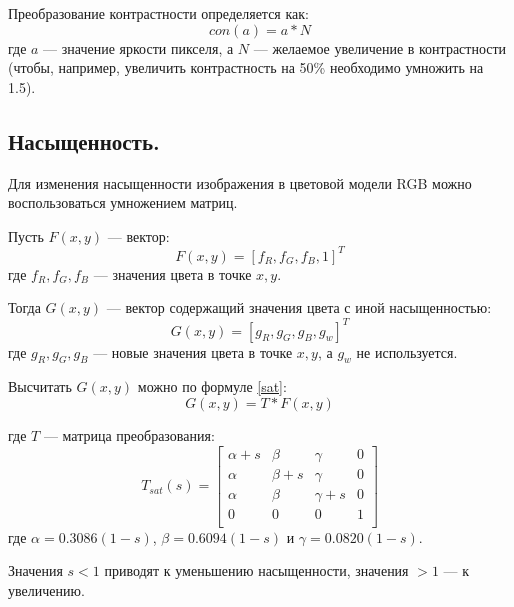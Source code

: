Преобразование контрастности определяется как:
\begin{equation}
	\label{contrast}
	con(a) = a * N
\end{equation}
где $a$ --- значение яркости пикселя, а $N$ --- желаемое увеличение в контрастности (чтобы, например, увеличить контрастность на 50\% необходимо умножить на 1.5). \cite{brk}


\subsection{Насыщенность.}

Для изменения насыщенности изображения в цветовой модели RGB можно воспользоваться умножением матриц.

Пусть $F(x,y)$ --- вектор:
\begin{equation}
	\label{F}
	F(x,y) = [f_R, f_G, f_B, 1]^T
\end{equation}
где $f_R, f_G, f_B$ --- значения цвета в точке $x,y$.

Тогда $G(x,y)$ --- вектор содержащий значения цвета с иной насыщенностью:
\begin{equation}
	\label{G}
	G(x,y) = [g_R, g_G, g_B, g_w]^T
\end{equation}
где $g_R, g_G, g_B$ --- новые значения цвета в точке $x,y$, а $g_w$ не используется.

Высчитать $G(x,y)$ можно по формуле \ref{sat}:
\begin{equation}
	\label{sat}
	G(x,y) = T * F(x,y)
\end{equation}

где $T$ --- матрица преобразования:
\begin{equation}
	\label{tsat}
	T_{sat}(s) = \begin{bmatrix}
					\alpha + s & \beta & \gamma & 0\\
				    \alpha & \beta + s & \gamma & 0 \\ 
					\alpha & \beta & \gamma + s & 0 \\ 
					0 & 0 & 0 & 1 \\ 
				\end{bmatrix}
\end{equation}
где $\alpha = 0.3086(1 - s)$, $\beta = 0.6094(1 - s)$ и $\gamma = 0.0820(1 - s)$.

Значения $s < 1$ приводят к уменьшению насыщенности, значения $> 1$ --- к увеличению. \cite{sat}


